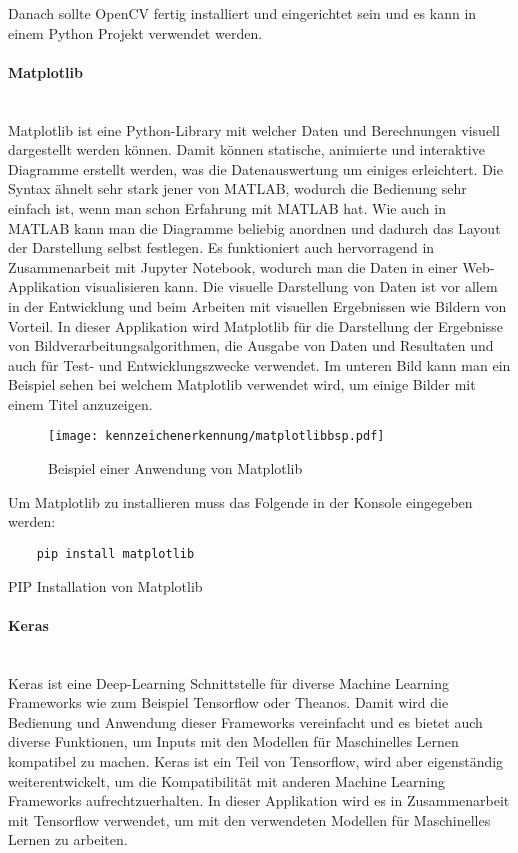 Danach sollte OpenCV fertig installiert und eingerichtet sein und es kann in einem Python Projekt verwendet werden.

\paragraph{Matplotlib}\mbox{}\\
Matplotlib ist eine Python-Library mit welcher Daten und Berechnungen visuell dargestellt werden können. Damit können 
statische, animierte und interaktive Diagramme erstellt werden, was die Datenauswertung um einiges erleichtert. 
Die Syntax ähnelt sehr stark jener von MATLAB, wodurch die Bedienung sehr einfach ist, wenn man schon Erfahrung mit 
MATLAB hat. Wie auch in MATLAB kann man die Diagramme beliebig anordnen und dadurch das Layout der Darstellung selbst 
festlegen. Es funktioniert auch hervorragend in Zusammenarbeit mit Jupyter Notebook, wodurch man die Daten in einer 
Web-Applikation visualisieren kann. Die visuelle Darstellung von Daten ist vor allem in der Entwicklung und beim 
Arbeiten mit visuellen Ergebnissen wie Bildern von Vorteil. In dieser Applikation wird Matplotlib für die Darstellung 
der Ergebnisse von Bildverarbeitungsalgorithmen, die Ausgabe von Daten und Resultaten und auch für Test- und 
Entwicklungszwecke verwendet. Im unteren Bild kann man ein Beispiel sehen bei welchem Matplotlib verwendet wird, 
um einige Bilder mit einem Titel anzuzeigen.

\begin{figure}[H]
    \centering
    \texttt{[image: kennzeichenerkennung/matplotlibbsp.pdf]}
    \caption{Beispiel einer Anwendung von Matplotlib}
\end{figure}

Um Matplotlib zu installieren muss das Folgende in der Konsole eingegeben werden:

\begin{listing}[H]
    \begin{verbatim}
    pip install matplotlib
    \end{verbatim}
    \caption{PIP Installation von Matplotlib}
\end{listing}

\paragraph{Keras}\mbox{}\\
Keras ist eine Deep-Learning Schnittstelle für diverse Machine Learning Frameworks wie zum Beispiel Tensorflow oder Theanos. 
Damit wird die Bedienung und Anwendung dieser Frameworks vereinfacht und es bietet auch diverse Funktionen, um Inputs mit 
den Modellen für Maschinelles Lernen kompatibel zu machen. Keras ist ein Teil von Tensorflow, wird aber eigenständig weiterentwickelt, 
um die Kompatibilität mit anderen Machine Learning Frameworks aufrechtzuerhalten. In dieser Applikation wird es in 
Zusammenarbeit mit Tensorflow verwendet, um mit den verwendeten Modellen für Maschinelles Lernen zu arbeiten.\\

